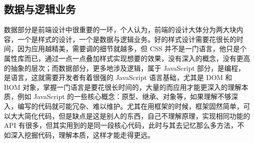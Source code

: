 \documentclass[UTF8]{ctexbook}
\begin{document}
    \subsection{数据与逻辑业务}
      \label{subsec:数据与逻辑业务}
        数据部分是前端设计中很重要的一环，个人认为，前端的设计大体分为两大块内容，一个是样式的设计，一个是数据与逻辑业务。好的样式设计需要花很长的时间，因为应用越精美，需要调的细节就越多，但 CSS 并不是一门语言，他只是个属性库而已，通过一点一点叠加样式实现想要的效果，没有深入的概念，没有更高的抽象的层次；而数据部分，更多地涉及逻辑，属于 JavaScript 部分，是编程，是语言，这就需要开发者有着很强的 JavaScript 语言基础，尤其是 DOM 和 BOM 对象，掌握一门语言是要花很长时间的，大量的而应用才能更深入的理解本质，例如 JavaScript 的一些核心概念：原型、继承、对象等，如果理解不够深入，编写的代码就可能冗杂、难以维护。尤其在用框架的时候，框架固然简单，可以大大简化代码，但是缺点是这是别人的东西，自己不理解原理，实现相同功能的 API 有很多，但其实用到的是同一段核心代码，此时与其去记忆那么多方法，不如深入挖掘代码，理解本质，这样才能走得更远。
\end{document}
